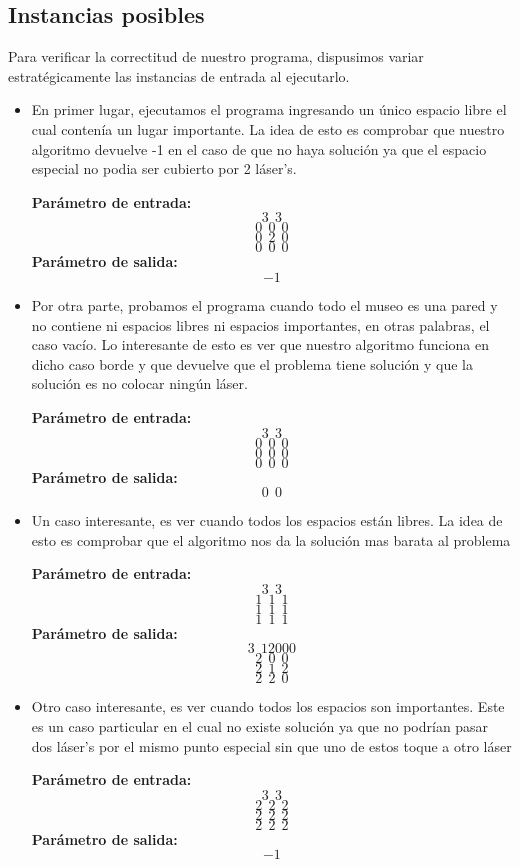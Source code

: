 \subsection{Instancias posibles}
Para verificar la correctitud de nuestro programa, dispusimos variar estratégicamente las instancias de entrada al ejecutarlo.
\begin{itemize}
\item En primer lugar, ejecutamos el programa ingresando un único espacio libre el cual contenía un lugar importante. La idea de esto es comprobar que nuestro algoritmo devuelve -1 en el caso de que no haya solución ya que el espacio especial no podia ser cubierto por 2 láser's.\newline

\textbf{Parámetro de entrada:} 
$$3\ \ 3$$
$$0\ \ 0\ \ 0$$
$$0\ \ 2\ \ 0$$
$$0\ \ 0\ \ 0$$
\textbf{Parámetro de salida:} $$-1$$\newline
\item Por otra parte, probamos el programa cuando todo el museo es una pared y no contiene ni espacios libres ni espacios importantes, en otras palabras, el caso vacío. Lo interesante de esto es ver que nuestro algoritmo funciona en dicho caso borde y que devuelve que el problema tiene solución y que la solución es no colocar ningún láser.\newline

\textbf{Parámetro de entrada:} 
$$3\ \ 3$$
$$0\ \ 0\ \ 0$$
$$0\ \ 0\ \ 0$$
$$0\ \ 0\ \ 0$$
\textbf{Parámetro de salida:} $$0\ \ 0$$\newline
\item Un caso interesante, es ver cuando todos los espacios están libres. La idea de esto es comprobar que el algoritmo nos da la solución mas barata al problema\newline

\textbf{Parámetro de entrada:} 
$$3\ \ 3$$
$$1\ \ 1\ \ 1$$
$$1\ \ 1\ \ 1$$
$$1\ \ 1\ \ 1$$
\textbf{Parámetro de salida:} 
$$3\ \ 12000$$
$$2\ \ 0\ \ 0$$
$$2\ \ 1\ \ 2$$
$$2\ \ 2\ \ 0$$
\newline

\item Otro caso interesante, es ver cuando todos los espacios son importantes. Este es un caso particular en el cual no existe solución ya que no podrían pasar dos láser's por el mismo punto especial sin que uno de estos toque a otro láser\newline

\textbf{Parámetro de entrada:} 
$$3\ \ 3$$
$$2\ \ 2\ \ 2$$
$$2\ \ 2\ \ 2$$
$$2\ \ 2\ \ 2$$
\textbf{Parámetro de salida:} $$-1$$\newline


\end{itemize}
